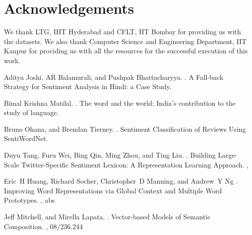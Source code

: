 \def\DevnagVersion{2.15}\documentclass[11pt]{article}
\begin{document}
\section*{Acknowledgements}
We thank LTG, IIIT Hyderabad and CFLT, IIT Bombay for providing us with the datasets. We also thank Computer Science and Engineering Department, IIT Kanpur for providing us with all the resources for the successful execution of this work.

%
%

\begin{thebibliography}{40}


Aditya Joshi, AR Balamurali, and Pushpak Bhattacharyya.
.
\newblock A Fall-back Strategy for Sentiment Analysis in Hindi: a Case Study.

Bimal Krishna Matilal.
.
\newblock The word and the world: India's contribution to the study of language.

Bruno Ohana, and Brendan Tierney.
.
\newblock Sentiment Classification of Reviews Using SentiWordNet.

Duyu Tang, Furu Wei, Bing Qin, Ming Zhou, and Ting Liu.
.
\newblock Building Large-Scale Twitter-Specific Sentiment Lexicon: A Representation Learning Approach.
,

Eric~H Huang, Richard Socher, Christopher~D Manning, and Andrew~Y Ng
.
\newblock Improving Word Representations via Global Context and Multiple Word Prototypes.
,
   abs
   
Jeff Mitchell, and Mirella Lapata.
.
\newblock Vector-based Models of Semantic Composition.
,
   08/236.244
   

\end{thebibliography}
\end{document}
